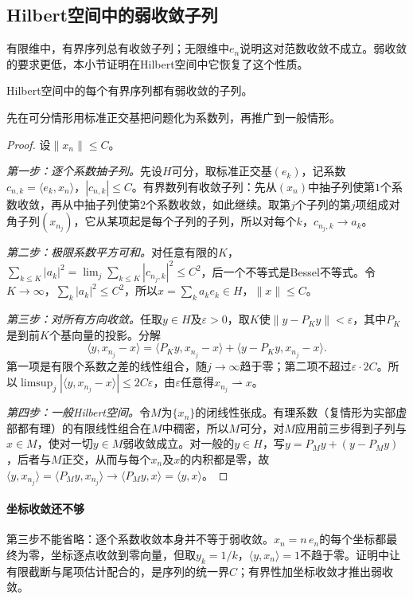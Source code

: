 \subsection{Hilbert空间中的弱收敛子列}
\label{sec:lfo-weak-subsequence}

有限维中，有界序列总有收敛子列；无限维中$e_n$说明这对范数收敛不成立。弱收敛的要求更低，本小节证明在Hilbert空间中它恢复了这个性质。

\begin{theorem}[Hilbert空间中的弱子列]
\label{thm:lfo-weak-subsequence}
Hilbert空间中的每个有界序列都有弱收敛的子列。
\end{theorem}

先在可分情形用标准正交基把问题化为系数列，再推广到一般情形。

\begin{proof}
设$\|x_n\|\leq C$。

\emph{第一步：逐个系数抽子列。}先设$H$可分，取标准正交基$(e_k)$，记系数$c_{n,k}=\langle e_k,x_n\rangle$，$|c_{n,k}|\leq C$。有界数列有收敛子列：先从$(x_n)$中抽子列使第$1$个系数收敛，再从中抽子列使第$2$个系数收敛，如此继续。取第$j$个子列的第$j$项组成对角子列$(x_{n_j})$，它从某项起是每个子列的子列，所以对每个$k$，$c_{n_j,k}\to a_k$。

\emph{第二步：极限系数平方可和。}对任意有限的$K$，$\sum_{k\leq K}|a_k|^2=\lim_j\sum_{k\leq K}|c_{n_j,k}|^2\leq C^2$，后一个不等式是Bessel不等式。令$K\to\infty$，$\sum_k|a_k|^2\leq C^2$，所以$x=\sum_ka_ke_k\in H$，$\|x\|\leq C$。

\emph{第三步：对所有方向收敛。}任取$y\in H$及$\varepsilon>0$，取$K$使$\|y-P_Ky\|<\varepsilon$，其中$P_K$是到前$K$个基向量的投影。分解
\[
 \langle y,x_{n_j}-x\rangle=\langle P_Ky,x_{n_j}-x\rangle+\langle y-P_Ky,x_{n_j}-x\rangle .
\]
第一项是有限个系数之差的线性组合，随$j\to\infty$趋于零；第二项不超过$\varepsilon\cdot2C$。所以$\limsup_j|\langle y,x_{n_j}-x\rangle|\leq2C\varepsilon$，由$\varepsilon$任意得$x_{n_j}\rightharpoonup x$。

\emph{第四步：一般Hilbert空间。}令$M$为$\{x_n\}$的闭线性张成。有理系数（复情形为实部虚部都有理）的有限线性组合在$M$中稠密，所以$M$可分，对$M$应用前三步得到子列与$x\in M$，使对一切$y\in M$弱收敛成立。对一般的$y\in H$，写$y=P_My+(y-P_My)$，后者与$M$正交，从而与每个$x_n$及$x$的内积都是零，故$\langle y,x_{n_j}\rangle=\langle P_My,x_{n_j}\rangle\to\langle P_My,x\rangle=\langle y,x\rangle$。
\end{proof}

\paragraph{坐标收敛还不够}
第三步不能省略：逐个系数收敛本身并不等于弱收敛。$x_n=n\,e_n$的每个坐标都最终为零，坐标逐点收敛到零向量，但取$y_k=1/k$，$\langle y,x_n\rangle=1$不趋于零。证明中让有限截断与尾项估计配合的，是序列的统一界$C$；有界性加坐标收敛才推出弱收敛。

